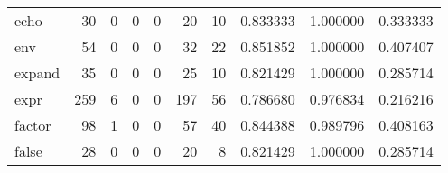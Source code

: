 \begin{longtable}{lrrrrrrrrr}
echo      &                                        30 &                                                  0 &                                                  0 &                                                  0 &                                                 20 &                                                 10 &                                           0.833333 &                               1.000000 &                             0.333333 \\
env       &                                        54 &                                                  0 &                                                  0 &                                                  0 &                                                 32 &                                                 22 &                                           0.851852 &                               1.000000 &                             0.407407 \\
expand    &                                        35 &                                                  0 &                                                  0 &                                                  0 &                                                 25 &                                                 10 &                                           0.821429 &                               1.000000 &                             0.285714 \\
expr      &                                       259 &                                                  6 &                                                  0 &                                                  0 &                                                197 &                                                 56 &                                           0.786680 &                               0.976834 &                             0.216216 \\
factor    &                                        98 &                                                  1 &                                                  0 &                                                  0 &                                                 57 &                                                 40 &                                           0.844388 &                               0.989796 &                             0.408163 \\
false     &                                        28 &                                                  0 &                                                  0 &                                                  0 &                                                 20 &                                                  8 &                                           0.821429 &                               1.000000 &                             0.285714 \\

\end{longtable}
